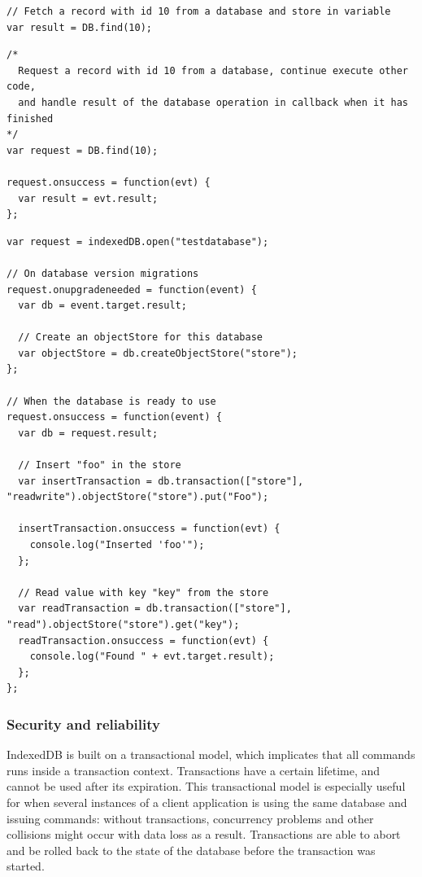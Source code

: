 \begin{Code}
\begin{lstlisting}[caption={Synchronous call}, label={lst:syncCall}]
// Fetch a record with id 10 from a database and store in variable
var result = DB.find(10);
\end{lstlisting}

\begin{lstlisting}[caption={Asynchronous call}, label={lst:asyncCall}]
/*
  Request a record with id 10 from a database, continue execute other code,
  and handle result of the database operation in callback when it has finished
*/
var request = DB.find(10);

request.onsuccess = function(evt) {
  var result = evt.result;
};
\end{lstlisting}
\end{Code}

\begin{Code}
\begin{lstlisting}[caption={Use of IndexedDB}]
var request = indexedDB.open("testdatabase");

// On database version migrations
request.onupgradeneeded = function(event) {
  var db = event.target.result;

  // Create an objectStore for this database
  var objectStore = db.createObjectStore("store");
};

// When the database is ready to use
request.onsuccess = function(event) {
  var db = request.result;

  // Insert "foo" in the store
  var insertTransaction = db.transaction(["store"], "readwrite").objectStore("store").put("Foo");

  insertTransaction.onsuccess = function(evt) {
    console.log("Inserted 'foo'");
  };

  // Read value with key "key" from the store
  var readTransaction = db.transaction(["store"], "read").objectStore("store").get("key");
  readTransaction.onsuccess = function(evt) {
    console.log("Found " + evt.target.result);
  };
};
\end{lstlisting}
\end{Code}

\subsubsection{Security and reliability}
\label{subsec:security}
IndexedDB is built on a transactional model, which implicates that all commands runs inside a transaction context. Transactions have a certain lifetime, and cannot be used after its expiration. This transactional model is especially useful for when several instances of a client application is using the same database and issuing commands: without transactions, concurrency problems and other collisions might occur with data loss as a result. Transactions are able to abort and be rolled back to the state of the database before the transaction was started.

